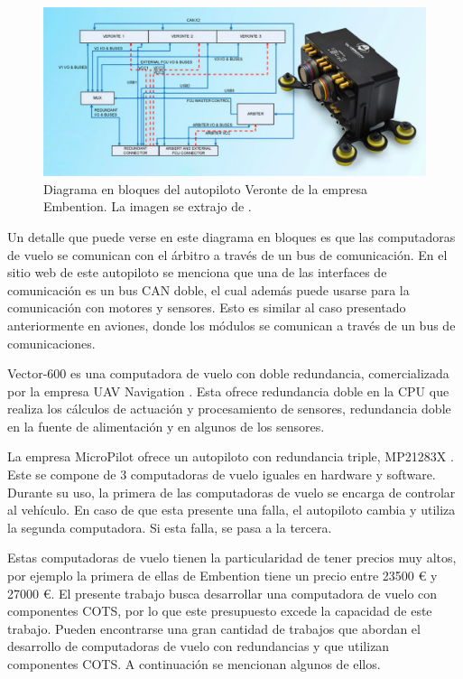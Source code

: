 \begin{figure}[H]
    \centering
    \includegraphics[width=\textwidth]{img/Veronte_Embention.png}
    \caption{Diagrama en bloques del autopiloto Veronte de la empresa Embention. La imagen se extrajo de \cite{embention-2023}.}
    \label{fig:Veronte_Embention}    
\end{figure}

Un detalle que puede verse en este diagrama en bloques es que las computadoras de vuelo se comunican con el árbitro a través de un bus de comunicación. En el sitio web de este autopiloto se menciona que una de las interfaces de comunicación es un bus CAN doble, el cual además puede usarse para la comunicación con motores y sensores. Esto es similar al caso presentado anteriormente en aviones, donde los módulos se comunican a través de un bus de comunicaciones.

Vector-600 es una computadora de vuelo con doble redundancia, comercializada por la empresa UAV Navigation \cite{uav-navigation-vector-600}. Esta ofrece redundancia doble en la CPU que realiza los cálculos de actuación y procesamiento de sensores, redundancia doble en la fuente de alimentación y en algunos de los sensores.

La empresa MicroPilot ofrece un autopiloto con redundancia triple, MP21283X \cite{wwwmicropilotcom-no-date}. Este se compone de 3 computadoras de vuelo iguales en hardware y software. Durante su uso, la primera de las computadoras de vuelo se encarga de controlar al vehículo. En caso de que esta presente una falla, el autopiloto cambia y utiliza la segunda computadora. Si esta falla, se pasa a la tercera.

Estas computadoras de vuelo tienen la particularidad de tener precios muy altos, por ejemplo la primera de ellas de Embention tiene un precio entre 23500 \euro{} y 27000 \euro{}. El presente trabajo busca desarrollar una computadora de vuelo con componentes COTS, por lo que este presupuesto excede la capacidad de este trabajo. Pueden encontrarse una gran cantidad de trabajos que abordan el desarrollo de computadoras de vuelo con redundancias y que utilizan componentes COTS. A continuación se mencionan algunos de ellos.

